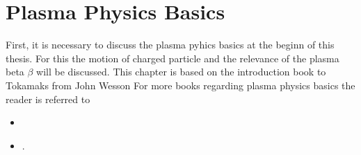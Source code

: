 
\chapter{Plasma Physics Basics}
\label{chap:plasmaPhysics}

\thispagestyle{empty}
\newpage

First, it is necessary to discuss the plasma pyhics basics at the beginn of this thesis. For this the motion of charged particle and the relevance of the plasma beta $\beta$ will be discussed. This chapter is based on the introduction book to Tokamaks from John Wesson\cite{Wesson2004} For more books regarding plasma physics basics the reader is referred to
\begin{itemize}
    \item {}
    \item {}.
\end{itemize}

\newpage